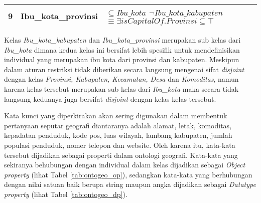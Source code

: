 \begin{longtabu}{|c|l|X|}
	9	&	Ibu\_kota\_provinsi		&	\begin{math} \subseteq Ibu\_kota \end{math} \newline \begin{math} \lnot Ibu\_kota\_kabupaten \end{math} \newline \begin{math} \equiv \exists isCapitalOf.Provinsi \subseteq \top \end{math} \\ \hline
\end{longtabu}

Kelas \emph{Ibu\_kota\_kabupaten} dan \emph{Ibu\_kota\_provinsi} merupakan sub kelas dari \emph{Ibu\_kota} dimana kedua kelas ini bersifat lebih spesifik untuk mendefinisikan individual yang merupakan ibu kota dari provinsi dan kabupaten. Meskipun dalam aturan restriksi tidak diberikan secara langsung mengenai sifat \emph{disjoint} dengan kelas \emph{Provinsi, Kabupaten, Kecamatan, Desa} dan \emph{Komoditas}, namun karena kelas tersebut merupakan sub kelas dari \emph{Ibu\_kota} maka secara tidak langsung keduanya juga bersifat \emph{disjoint} dengan kelas-kelas tersebut.

Kata kunci yang diperkirakan akan sering digunakan dalam membentuk pertanyaan seputar geografi diantaranya adalah alamat, letak, komoditas, kepadatan penduduk, kode pos, luas wilayah, lambang kabupaten, jumlah populasi penduduk, nomer telepon dan website. Oleh karena itu, kata-kata tersebut dijadikan sebagai properti dalam ontologi geografi. Kata-kata yang sekiranya behubungan dengan individual dalam kelas dijadikan sebagai \emph{Object property} (lihat Tabel \ref{tab:ontogeo_op}), sedangkan kata-kata yang berhubungan dengan nilai satuan baik berupa string maupun angka dijadikan sebagai \emph{Datatype property} (lihat Tabel \ref{tab:ontogeo_dp}).

